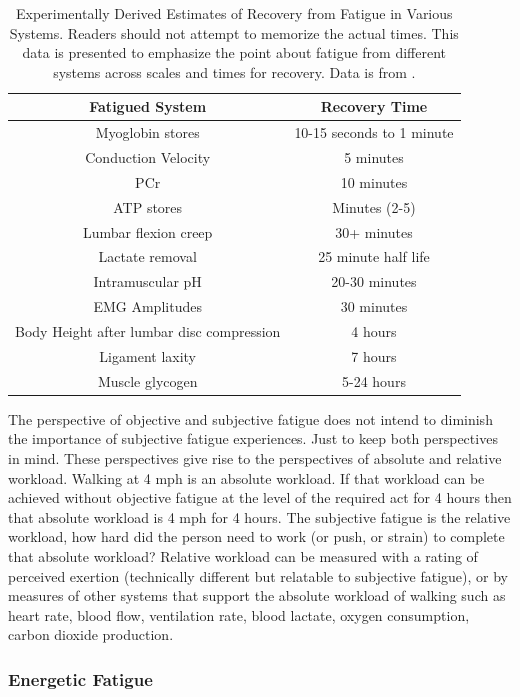 \begin{table}[h!]
\centering
\begin{tabular}{||c c ||} 
 \hline
 Fatigued System & Recovery Time\\ [0.5ex] 
 \hline\hline
 Myoglobin stores & 10-15 seconds to 1 minute \\
 Conduction Velocity  & 5 minutes\\ 
 PCr & 10 minutes  \\
 ATP stores &  Minutes (2-5) \\ 
 Lumbar flexion creep & 30+ minutes \\
 Lactate removal & 25 minute half life \\
 Intramuscular pH & 20-30 minutes \\
 EMG Amplitudes & 30 minutes \\
 Body Height after lumbar disc compression & 4 hours \\
 Ligament laxity & 7 hours \\
 Muscle glycogen & 5-24 hours \\[1ex] 
 \hline
\end{tabular}
\caption{Experimentally Derived Estimates of Recovery from Fatigue in Various Systems. Readers should not attempt to memorize the actual times. This data is presented to emphasize the point about fatigue from different systems across scales and times for recovery. Data is from \cite{krajcarski_time_2008}.}
\label{table:fatigue_recovery}
\end{table}


The perspective of objective and subjective fatigue does not intend to diminish the importance of subjective fatigue experiences. Just to keep both perspectives in mind. These perspectives give rise to the perspectives of absolute and relative workload. Walking at 4 mph is an absolute workload. If that workload can be achieved without objective fatigue at the level of the required act for 4 hours then that absolute workload is 4 mph for 4 hours. The subjective fatigue is the relative workload, how hard did the person need to work (or push, or strain) to complete that absolute workload? Relative workload can be measured with a rating of perceived exertion (technically different but relatable to subjective fatigue), or by measures of other systems that support the absolute workload of walking such as heart rate, blood flow, ventilation rate, blood lactate, oxygen consumption, carbon dioxide production. 

\subsubsection{Energetic Fatigue}

